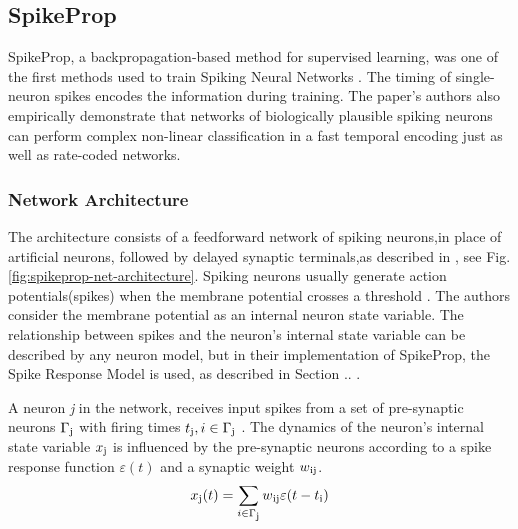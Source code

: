 \documentclass[12pt]{report}
\begin{document}
\subsection{SpikeProp}
SpikeProp, a backpropagation-based method for supervised learning, was one of the first methods used to train Spiking Neural Networks \cite{bohte2002}. The timing of single-neuron spikes encodes the information during training. The paper's authors also empirically demonstrate that networks of biologically plausible spiking neurons can perform complex non-linear classification in a fast temporal encoding just as well as rate-coded networks.
\subsubsection{Network Architecture}
The architecture consists of a feedforward network of spiking neurons,in place of artificial neurons, followed by delayed synaptic terminals,as described in \cite{ruf1998}, see Fig. \ref{fig:spikeprop-net-architecture}. Spiking neurons usually generate action potentials(spikes) when the membrane potential crosses a threshold . The authors consider the membrane potential as an internal neuron state variable. The relationship between spikes and the neuron's internal state variable can be described by any neuron model, but in their implementation of SpikeProp, the Spike Response Model is used, as described in Section .. .

A neuron \textit{j} in the network, receives input spikes from a set of pre-synaptic neurons \(\Gamma\textsubscript{j}\) with firing times \(t\textsubscript{j},i\in\Gamma\textsubscript{j}\) . The dynamics of the neuron's internal state variable \(x\textsubscript{j}\) is influenced by the pre-synaptic neurons according to a spike response function \(\varepsilon(t)\) and a synaptic weight \(w\textsubscript{ij}\).
\begin{equation}
    x\textsubscript{j}(t) = \sum_{i\in\Gamma\textsubscript{j}} w\textsubscript{ij}\varepsilon(t-t\textsubscript{i})
\end{equation}
\end{document}
